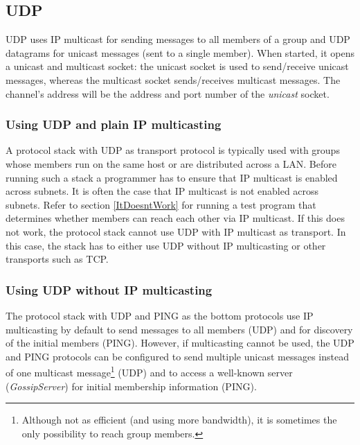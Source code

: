     \subsection{UDP}

    UDP uses IP multicast for sending messages to all members of a group and UDP
    datagrams for unicast messages (sent to a single member). When started, it opens
    a unicast and multicast socket: the unicast socket is used to send/receive
    unicast messages, whereas the multicast socket sends/receives multicast
    messages. The channel's address will be the address and port number of the {\em
    unicast} socket.


      \subsubsection{Using UDP and plain IP multicasting}

      A protocol stack with UDP as transport protocol is typically used with groups
      whose members run on the same host or are distributed across a LAN. Before
      running such a stack a programmer has to ensure that IP multicast is enabled
      across subnets. It is often the case that IP multicast is not enabled across
      subnets. Refer to section \ref{ItDoesntWork} for running a test program that
      determines whether members can reach each other via IP multicast. If this does
      not work, the protocol stack cannot use UDP with IP multicast as transport. In
      this case, the stack has to either use UDP without IP multicasting or other
      transports such as TCP.



      \subsubsection{Using UDP without IP multicasting} \label{IpNoMulticast}

      The protocol stack with UDP and PING as the bottom protocols use IP
      multicasting by default to send messages to all members (UDP) and for discovery
      of the initial members (PING). However, if multicasting cannot be used, the UDP
      and PING protocols can be configured to send multiple unicast messages instead
      of one multicast message\footnote{Although not as efficient (and using more
      bandwidth), it is sometimes the only possibility to reach group members.} (UDP)
      and to access a well-known server ({\em GossipServer}) for initial membership
      information (PING).

